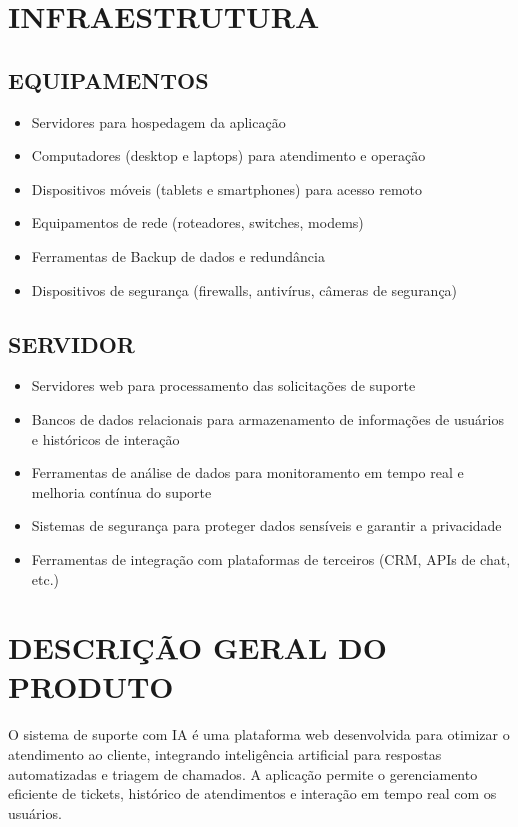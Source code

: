 \documentclass[a4paper,12pt]{article}
\begin{document}
\section{INFRAESTRUTURA}
\subsection{EQUIPAMENTOS}
\begin{itemize}
    \item Servidores para hospedagem da aplicação
    \item Computadores (desktop e laptops) para atendimento e operação
    \item Dispositivos móveis (tablets e smartphones) para acesso remoto
    \item Equipamentos de rede (roteadores, switches, modems)
    \item Ferramentas de Backup de dados e redundância
    \item Dispositivos de segurança (firewalls, antivírus, câmeras de segurança)
\end{itemize}
\clearpage

\subsection{SERVIDOR}
\begin{itemize}
    \item Servidores web para processamento das solicitações de suporte
    \item Bancos de dados relacionais para armazenamento de informações de usuários e históricos de interação
    \item Ferramentas de análise de dados para monitoramento em tempo real e melhoria contínua do suporte
    \item Sistemas de segurança para proteger dados sensíveis e garantir a privacidade
    \item Ferramentas de integração com plataformas de terceiros (CRM, APIs de chat, etc.)
\end{itemize}

\section{DESCRIÇÃO GERAL DO PRODUTO}
O sistema de suporte com IA é uma plataforma web desenvolvida para otimizar o atendimento ao cliente, integrando inteligência artificial para respostas automatizadas e triagem de chamados. A aplicação permite o gerenciamento eficiente de tickets, histórico de atendimentos e interação em tempo real com os usuários.
\end{document}
